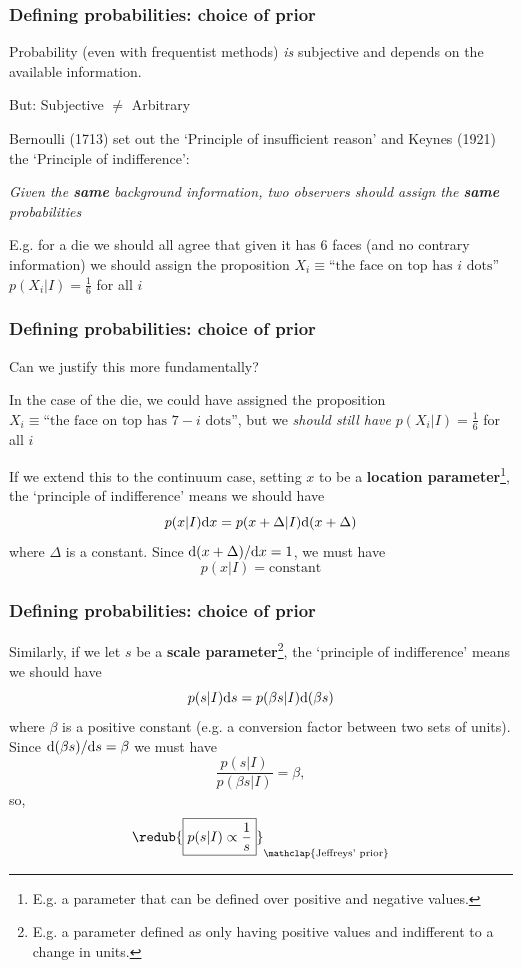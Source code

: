 \begin{frame}

\frametitle{Defining probabilities: choice of prior}
\label{definingprobabilities:choiceofprior}

Probability (even with frequentist methods) \emph{is} subjective and depends on the available information.
\begin{center}
But: {\color{red}Subjective $\ne$ Arbitrary}
\end{center}
Bernoulli (1713) set out the `Principle of insufficient reason' and Keynes (1921) the `Principle of indifference':

\emph{Given the \textbf{same} background information, two observers should assign the \textbf{same} probabilities}

E.g. for a die we should all agree that given it has 6 faces (and no contrary information)
we should assign the proposition $X_i \equiv \text{``the face on top has }i\text{ dots''}$ $p(X_i|I) = \frac{1}{6}$ for all $i$

\end{frame}

\begin{frame}

\frametitle{Defining probabilities: choice of prior}
\label{definingprobabilities:choiceofprior}

Can we justify this more fundamentally?

In the case of the die, we could have assigned the proposition $X_i \equiv \text{``the face on top has }7-i\text{ dots''}$, but we \emph{should still have} $p(X_i|I) = \frac{1}{6}$ for all $i$

If we extend this to the continuum case, setting $x$ to be a \textbf{location parameter}\footnote{E.g. a parameter that can be defined over positive and negative values.}, the `principle of indifference'
means we should have
\[
 p(x|I){\rm d}x = p(x+\Delta|I){\rm d}(x+\Delta)
\]
where $\Delta$ is a constant. Since ${\rm d}(x+\Delta)/{\rm d}x = 1$, we must have
\[
\boxed{p(x|I) = \text{constant}}
\]

\end{frame}

\begin{frame}

\frametitle{Defining probabilities: choice of prior}
\label{definingprobabilities:choiceofprior}

Similarly, if we let $s$ be a \textbf{scale parameter}\footnote{E.g. a parameter defined as only having positive values and indifferent to a change in units.}, the `principle of indifference'
means we should have
\[
p(s|I){\rm d}s = p(\beta s|I){\rm d}(\beta s)
\]
where $\beta$ is a positive constant (e.g. a conversion factor between two sets of units).
Since ${\rm d}(\beta s)/{\rm d}s = \beta$ we must have
\[
\frac{p(s|I)}{p(\beta s|I)} = \beta,
\]
so,
\[
\redub{\boxed{p(s|I) \propto \frac{1}{s}}}_{\mathclap{\text{Jeffreys' prior}}}
\]

\end{frame}

